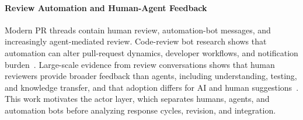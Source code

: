 \documentclass[10pt,conference,anonymous]{IEEEtran}
\begin{document}
\paragraph{Review Automation and Human-Agent Feedback}
Modern PR threads contain human review, automation-bot messages, and increasingly agent-mediated review.
Code-review bot research shows that automation can alter pull-request dynamics, developer workflows, and notification burden~\cite{wesselEffectsAdoptingCode2020,wesselQualityGatekeepersInvestigating2022,wesselDontDisturbMe2021}.
Large-scale evidence from review conversations shows that human reviewers provide broader feedback than agents, including understanding, testing, and knowledge transfer, and that adoption differs for AI and human suggestions~\cite{zhongHumanAISynergyAgentic2026}.
This work motivates the actor layer, which separates humans, agents, and automation bots before analyzing response cycles, revision, and integration.
\end{document}
